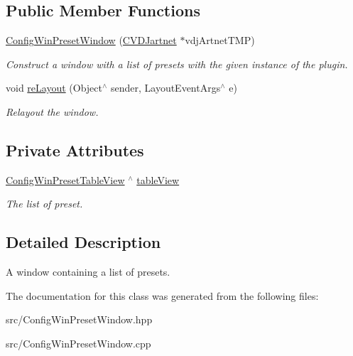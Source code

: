 \subsection*{Public Member Functions}
\begin{DoxyCompactItemize}
\item 
\mbox{\label{classConfigWinPresetWindow_aaa53b5d271475994781c405cddb81d90}} 
\hyperlink{classConfigWinPresetWindow_aaa53b5d271475994781c405cddb81d90}{Config\+Win\+Preset\+Window} (\hyperlink{classCVDJartnet}{C\+V\+D\+Jartnet} $\ast$vdj\+Artnet\+T\+MP)
\begin{DoxyCompactList}\small\item\em Construct a window with a list of presets with the given instance of the plugin. \end{DoxyCompactList}\item 
\mbox{\label{classConfigWinPresetWindow_ae821eddfb5203330ef3731a0a4367b48}} 
void \hyperlink{classConfigWinPresetWindow_ae821eddfb5203330ef3731a0a4367b48}{re\+Layout} (Object$^\wedge$ sender, Layout\+Event\+Args$^\wedge$ e)
\begin{DoxyCompactList}\small\item\em Relayout the window. \end{DoxyCompactList}\end{DoxyCompactItemize}
\subsection*{Private Attributes}
\begin{DoxyCompactItemize}
\item 
\mbox{\label{classConfigWinPresetWindow_a39234b6105a76a2864775e51d53ea719}} 
\hyperlink{classConfigWinPresetTableView}{Config\+Win\+Preset\+Table\+View} $^\wedge$ \hyperlink{classConfigWinPresetWindow_a39234b6105a76a2864775e51d53ea719}{table\+View}
\begin{DoxyCompactList}\small\item\em The list of preset. \end{DoxyCompactList}\end{DoxyCompactItemize}


\subsection{Detailed Description}
A window containing a list of presets. 

The documentation for this class was generated from the following files\+:\begin{DoxyCompactItemize}
\item 
src/Config\+Win\+Preset\+Window.\+hpp\item 
src/Config\+Win\+Preset\+Window.\+cpp\end{DoxyCompactItemize}
